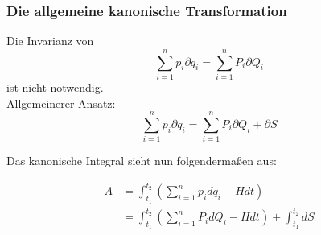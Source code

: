 \begin{frame}
    \frametitle{Die allgemeine kanonische Transformation}
    Die Invarianz von    
    \begin{displaymath}
            \sum_{i=1}^n p_i \partial q_i = \sum_{i=1}^n P_i \partial Q_i
    \end{displaymath}
    ist nicht notwendig. \\
    
    Allgemeinerer Ansatz:
    \begin{displaymath}
    \sum_{i=1}^n p_i \partial q_i = \sum_{i=1}^n P_i \partial Q_i + \partial S
    \end{displaymath}

\end{frame}

\begin{frame}

    Das kanonische Integral sieht nun folgendermaßen aus:
    
    \begin{align*}
    A &= \int_{t_1}^{t_2} \left( \sum_{i=1}^n p_i dq_i - H dt \right) \\
      &= \int_{t_1}^{t_2} \left( \sum_{i=1}^n P_i dQ_i - H dt \right)  +  \int_{t_1}^{t_2} dS
    \end{align*}
    
\end{frame}